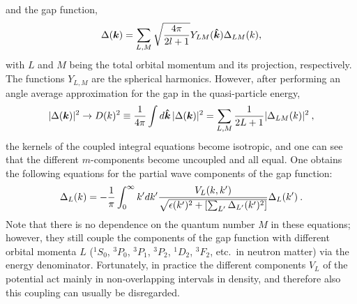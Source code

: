 \documentclass[rmp,preprint,aps,floatfix]{revtex4}
\begin{document}
and the gap function, 
\begin{equation}
  \Delta(\bm{k}) = 
  \sum_{L,M} \sqrt{4\pi\over 2l+1} Y_{LM}(\bm{\hat{k}}) \Delta_{LM}(k),
\end{equation}
with $L$ and $M$ being the total orbital momentum and its projection, respectively.
The functions $ Y_{L,M}$ are the spherical harmonics. 
However, after performing an angle average approximation for the gap in the
quasi-particle energy,
\begin{equation}
  |\Delta(\bm{k})|^2 \rightarrow D(k)^2 \equiv 
  {1\over 4\pi} \int d\bm{\hat{k}}\, |\Delta(\bm{k})|^2 =
  \sum_{L,M} {1\over 2L+1} |\Delta_{LM}(k)|^2 \:,
\end{equation}
the kernels of the coupled integral equations become isotropic, and one can 
see that the different $m$-components become uncoupled and all equal. 
One obtains the following equations for the 
partial wave components of the gap function:
\begin{equation}
  \Delta_L(k) = - {1\over\pi} \int_0^\infty 
  k' dk'{V_L(k,k') \over \sqrt{ \epsilon(k')^2 + 
  \left[\sum_{L'} \Delta_{L'}(k')^2 \right] }}
  \Delta_L(k') \:.
\end{equation}
Note that there is no dependence on the quantum number $M$ in these 
equations; however, they still couple the components of the
gap function with different orbital momenta $L$ 
($^1S_0$, $^3P_0$, $^3P_1$, $^3P_2$, $^1D_2$, $^3F_2$, etc.~in neutron matter) 
via the energy denominator.
Fortunately, in practice the different components $V_L$ of the potential
act mainly in non-overlapping intervals in density, 
and therefore also this coupling can usually be disregarded.
\end{document}
